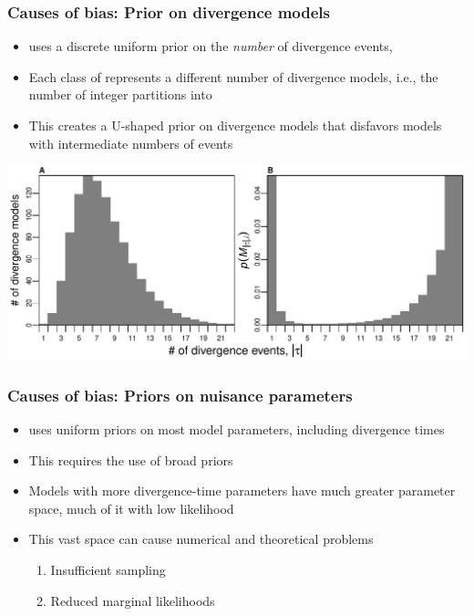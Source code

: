 \begin{frame}
    \frametitle{Causes of bias: Prior on divergence models}
    \begin{itemize}
        \item \msb uses a discrete uniform prior on the \emph{number} of
            divergence events, \divTimeNum
        \item Each class of \divTimeNum represents a different number of
            divergence models, i.e., the number of integer partitions
            \divTimeNum into \npairs{}
        \item This creates a U-shaped prior on divergence models that disfavors
            models with intermediate numbers of events
    \end{itemize}
    \centerline{
    \includegraphics[width=\textwidth]{images/partition_numbers.pdf}}
\end{frame}


\begin{frame}
    \frametitle{Causes of bias: Priors on nuisance parameters}
    \begin{itemize}
        \item \msb uses uniform priors on most model parameters, including
            divergence times
        \item This requires the use of broad priors
        \item Models with more divergence-time parameters have much greater
            parameter space, much of it with low likelihood
        \item This vast space can cause numerical and theoretical problems
        \begin{enumerate}
            \item Insufficient sampling
            \item Reduced marginal likelihoods
        \end{enumerate}
    \end{itemize}
\end{frame}


